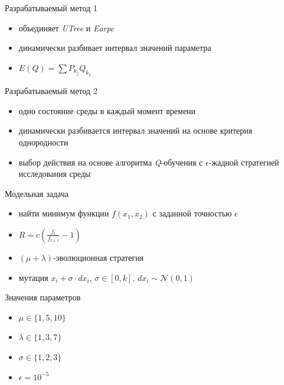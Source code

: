 \documentclass[hyperref=unicode,graphics=pdflatex,13pt]{beamer}
\begin{document}
\begin{frame}{Разрабатываемый метод 1}
    \begin{itemize}
        \item объединяет \textit{UTree} и \textit{Earpc}
        \item динамически разбивает интервал значений параметра
        \item $E(Q) = \sum{P_{k_j}Q_{k_j}}$
    \end{itemize}
\end{frame}

\begin{frame}{Разрабатываемый метод 2}
  \begin{itemize}
   \item одно состояние среды в каждый момент времени
   \item динамически разбивается интервал значений на основе критерия однородности
   \item выбор действия на основе алгоритма \textit{Q}-обучения с $\epsilon$-жадной стратегией исследования среды
  \end{itemize}
\end{frame}

\begin{frame}{Модельная задача}
    \begin{itemize}
        \item найти минимум функции $f(x_1, x_2)$ с заданной точностью $\epsilon$
        \item $R = c(\frac{f_t}{f_{t + 1}} - 1)$
        \item $(\mu+\lambda)$-эволюционная стратегия
        \item мутация $x_i + \sigma \cdot dx_i$, $\sigma \in [0, k]$, $dx_i \sim \mathcal{N}(0,1)$
    \end{itemize}
\end{frame}

\begin{frame}{Значения параметров}
	\begin{itemize}
		 \item $\mu \in \{1, 5, 10\}$
		 \item $\lambda \in \{1, 3, 7\}$
		 \item $\sigma \in \{1, 2, 3\}$
		 \item $\epsilon = 10^{-5}$
	\end{itemize}
\end{frame}
\end{document}
